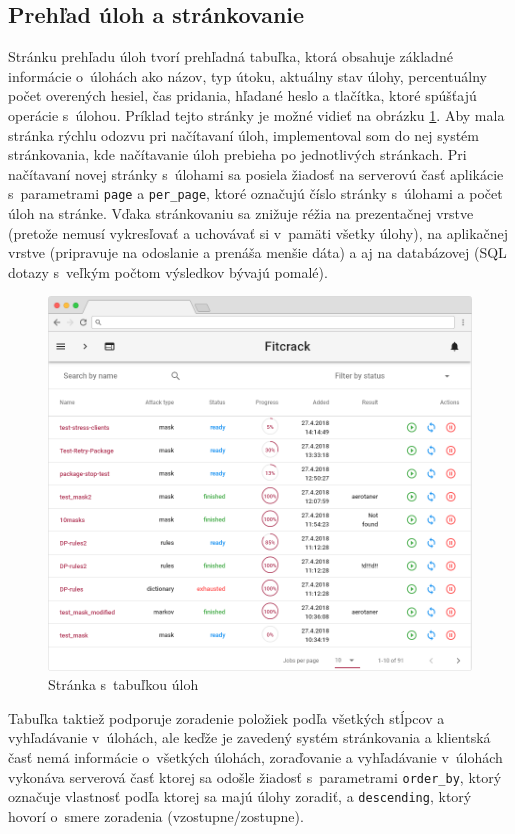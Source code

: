 \documentclass[zadani,slovak]{fitthesis}
\begin{document}
\subsection{Prehľad úloh a stránkovanie}
Stránku prehľadu úloh tvorí prehľadná tabuľka, ktorá obsahuje základné informácie o~úlohách ako názov, typ útoku, aktuálny stav úlohy, percentuálny počet overených hesiel, čas pridania, hľadané heslo a tlačítka, ktoré spúšťajú operácie s~úlohou. Príklad tejto stránky je možné vidieť na obrázku \ref{fig:jobsPage}. Aby mala stránka rýchlu odozvu pri načítavaní úloh, implementoval som do nej systém stránkovania, kde načítavanie úloh prebieha po jednotlivých stránkach. Pri načítavaní novej stránky s~úlohami sa posiela žiadosť na serverovú časť aplikácie s~parametrami \texttt{page} a \texttt{per\_page}, ktoré označujú číslo stránky s~úlohami a počet úloh na stránke. Vďaka stránkovaniu sa znižuje réžia na prezentačnej vrstve (pretože nemusí vykresľovať a uchovávať si v~pamäti všetky úlohy), na aplikačnej vrstve (pripravuje na odoslanie a prenáša menšie dáta) a aj na databázovej (SQL dotazy s~veľkým počtom výsledkov bývajú pomalé).
\begin{figure}[h]
    \centering
    \includegraphics[scale=0.46]{obrazky/jobsFrame2.PNG}
    \caption{Stránka s~tabuľkou úloh}
    \label{fig:jobsPage}
\end{figure}
\noindent
Tabuľka taktiež podporuje zoradenie položiek podľa všetkých stĺpcov a vyhľadávanie v~úlohách, ale keďže je zavedený systém stránkovania a klientská časť nemá informácie o~všetkých úlohách, zoraďovanie a vyhľadávanie v~úlohách vykonáva serverová časť ktorej sa odošle žiadosť s~parametrami \texttt{order\_by}, ktorý označuje vlastnosť podľa ktorej sa majú úlohy zoradiť, a \texttt{descending}, ktorý hovorí o~smere zoradenia (vzostupne/zostupne).
\end{document}
